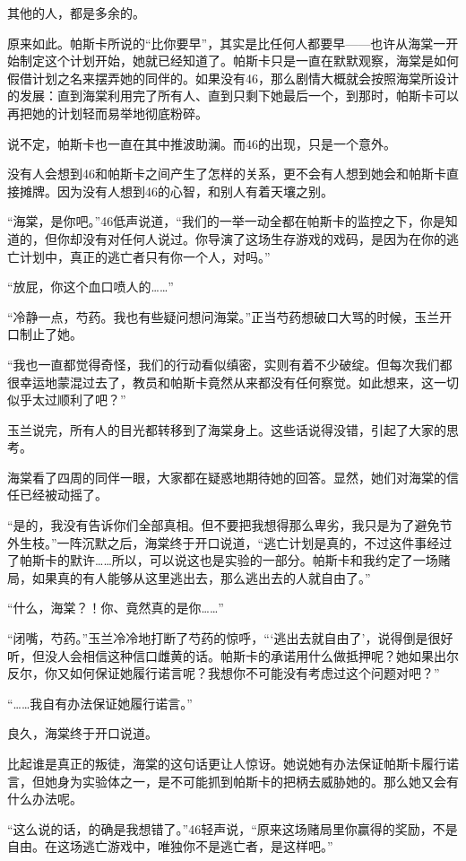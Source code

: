 其他的人，都是多余的。

原来如此。帕斯卡所说的“比你要早”，其实是比任何人都要早——也许从海棠一开始制定这个计划开始，她就已经知道了。帕斯卡只是一直在默默观察，海棠是如何假借计划之名来摆弄她的同伴的。如果没有46，那么剧情大概就会按照海棠所设计的发展：直到海棠利用完了所有人、直到只剩下她最后一个，到那时，帕斯卡可以再把她的计划轻而易举地彻底粉碎。

说不定，帕斯卡也一直在其中推波助澜。而46的出现，只是一个意外。

没有人会想到46和帕斯卡之间产生了怎样的关系，更不会有人想到她会和帕斯卡直接摊牌。因为没有人想到46的心智，和别人有着天壤之别。

“海棠，是你吧。”46低声说道，“我们的一举一动全都在帕斯卡的监控之下，你是知道的，但你却没有对任何人说过。你导演了这场生存游戏的戏码，是因为在你的逃亡计划中，真正的逃亡者只有你一个人，对吗。”

“放屁，你这个血口喷人的……”

“冷静一点，芍药。我也有些疑问想问海棠。”正当芍药想破口大骂的时候，玉兰开口制止了她。

“我也一直都觉得奇怪，我们的行动看似缜密，实则有着不少破绽。但每次我们都很幸运地蒙混过去了，教员和帕斯卡竟然从来都没有任何察觉。如此想来，这一切似乎太过顺利了吧？”

玉兰说完，所有人的目光都转移到了海棠身上。这些话说得没错，引起了大家的思考。

海棠看了四周的同伴一眼，大家都在疑惑地期待她的回答。显然，她们对海棠的信任已经被动摇了。

“是的，我没有告诉你们全部真相。但不要把我想得那么卑劣，我只是为了避免节外生枝。”一阵沉默之后，海棠终于开口说道，“逃亡计划是真的，不过这件事经过了帕斯卡的默许……所以，可以说这也是实验的一部分。帕斯卡和我约定了一场赌局，如果真的有人能够从这里逃出去，那么逃出去的人就自由了。”

“什么，海棠？！你、竟然真的是你……”

“闭嘴，芍药。”玉兰冷冷地打断了芍药的惊呼，“‘逃出去就自由了’，说得倒是很好听，但没人会相信这种信口雌黄的话。帕斯卡的承诺用什么做抵押呢？她如果出尔反尔，你又如何保证她履行诺言呢？我想你不可能没有考虑过这个问题对吧？”

“……我自有办法保证她履行诺言。”

良久，海棠终于开口说道。

比起谁是真正的叛徒，海棠的这句话更让人惊讶。她说她有办法保证帕斯卡履行诺言，但她身为实验体之一，是不可能抓到帕斯卡的把柄去威胁她的。那么她又会有什么办法呢。

“这么说的话，的确是我想错了。”46轻声说，“原来这场赌局里你赢得的奖励，不是自由。在这场逃亡游戏中，唯独你不是逃亡者，是这样吧。”

